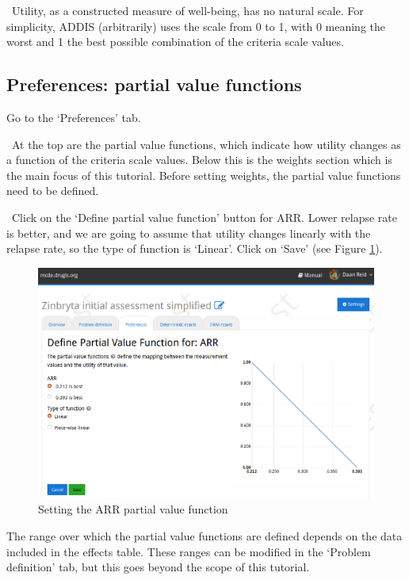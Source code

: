 \documentclass[00_mcda_tutorial.tex]{subfiles}
\begin{document}
\noindent \faGraduationCap \, Utility, as a constructed measure of well-being, has no natural scale. For simplicity, ADDIS (arbitrarily) uses the scale from 0 to 1, with 0 meaning the worst and 1 the best possible combination of the criteria scale values.

\subsection*{Preferences: partial value functions}
\leftpointright Go to the ‘Preferences’ tab.
\newline

\noindent \faGraduationCap \, At the top are the partial value functions, which indicate how utility changes as a function of the criteria scale values. Below this is the weights section which is the main focus of this tutorial. Before setting weights, the partial value functions need to be defined.
\newline

\noindent \leftpointright \, Click on the ‘Define partial value function’ button for ARR. Lower relapse rate is better, and we are going to assume that utility changes linearly with the relapse rate, so the type of function is ‘Linear’. Click on ‘Save’ (see Figure \ref{fig:pvf}).

\begin{figure}[!h]
    \centering
	\includegraphics[width=\textwidth]{fig/setPvf.png}
    \caption{Setting the ARR partial value function}
	\label{fig:pvf}
\end{figure}

\noindent The range over which the partial value functions are defined depends on the data included in the effects table. These ranges can be modified in the ‘Problem definition’ tab, but this goes beyond the scope of this tutorial.
\newline
\end{document}
